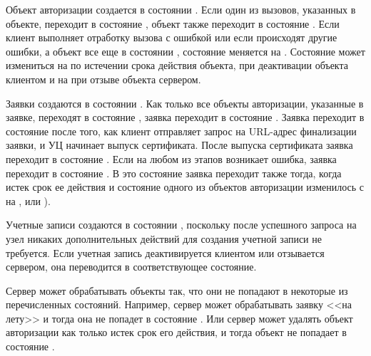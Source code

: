 Объект авторизации создается в состоянии . Если один из вызовов, 
указанных в объекте, переходит в состояние , объект также переходит 
в состояние . Если клиент выполняет отработку вызова с ошибкой
или если происходят другие ошибки, а объект все еще в состоянии ,
состояние меняется на . Состояние 
может измениться на  по истечении срока действия объекта,
 при деактивации объекта клиентом и на 
 при отзыве объекта сервером.

Заявки создаются в состоянии . Как только все объекты 
авторизации, указанные в заявке, переходят в состояние , заявка 
переходит в состояние . Заявка переходит в состояние 
 после того, как клиент отправляет запрос на URL-адрес 
финализации заявки, и УЦ начинает выпуск сертификата. 
%
После выпуска сертификата заявка переходит в состояние . 
%
Если на любом из этапов возникает ошибка, заявка переходит в состояние 
. В это состояние заявка переходит также тогда, когда 
истек срок ее действия и состояние одного из объектов авторизации изменилось
с  на ,  или ).

Учетные записи создаются в состоянии , поскольку после 
успешного запроса на узел  никаких дополнительных действий для 
создания учетной записи не требуется. Если учетная запись деактивируется 
клиентом или отзывается сервером, она переводится в соответствующее состояние.

\begin{note*}
Сервер может обрабатывать объекты так, что они не попадают в некоторые из 
перечисленных состояний. Например, сервер может обрабатывать заявку <<на лету>>
и тогда она не попадет в состояние . Или сервер может удалять
объект авторизации как только истек срок его действия, и тогда объект не 
попадает в состояние .
\end{note*}

